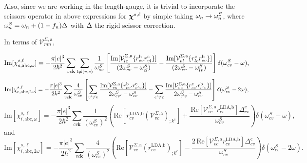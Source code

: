 \documentclass{article}
\begin{document}
Also, since we are working in the length-gauge, it is trivial to
incorporate the scissors operator in above expressions for $\boldsymbol{\chi}^{s,\ell}$
by simple taking
$\omega_n\to\omega_n^S$, where $\omega_n^S=\omega_n+(1-f_n)\Delta$ with $\Delta$ the
rigid scissor correction.\cite{nastos_scissors_2005,cabellos_effects_2009}

In terms of $\mathcal{V}^{\Sigma,\text{a}}_{mn}$,

\begin{equation}\label{calvimchiewn}
\mathrm{Im}[\chi_{e,\mathrm{a}\mathrm{b}\mathrm{c},\omega}^{s,\ell}] =
-\frac{\pi |e|^3}{2\hbar^2}\sum_{vc\mathbf{k}}\sum_{l\neq(v,c)}\frac{1}{\omega^{S}_{cv}}
\left[
\frac{\mathrm{Im}[\mathcal{V}^{\Sigma,\text{a}}_{lc}\{r^{\mathrm{b}}_{cv}r^{\mathrm{c}}_{vl}\}]}{(2\omega^S_{cv}-\omega^S_{cl})}
-\frac{\mathrm{Im}[\mathcal{V}^{\Sigma,\text{a}}_{vl}\{r^{\mathrm{c}}_{lc}r^{\mathrm{b}}_{cv}\}]}{(2\omega^S_{cv}-\omega^S_{lv})}
\right]\delta(\omega^S_{cv}-\omega),
\end{equation}  
\begin{equation}\label{calvimchie2wn}
\mathrm{Im}[\chi_{e,\mathrm{a}\mathrm{b}\mathrm{c},2\omega}^{s,\ell}] =
-\frac{\pi |e|^3}{2\hbar^2}\sum_{vc\mathbf{k}}\frac{4}{\omega^{S}_{cv}}
\left[
\sum_{v'\ne v}\frac{\mathrm{Im}[\mathcal{V}^{\Sigma,\text{a}}_{vc}\{r^{\mathrm{b}}_{cv'}r^{\mathrm{c}}_{v'v}\}]}{2\omega^S_{cv'}-\omega^S_{cv}}
- \sum_{c'\ne c}\frac{\mathrm{Im}[\mathcal{V}^{\Sigma,\text{a}}_{vc}\{r^{\mathrm{c}}_{cc'}r^{\mathrm{b}}_{c'v}\}]}{2\omega^S_{c'v}-\omega^S_{cv}}
\right]\delta(\omega^S_{cv}-2\omega),
\end{equation}
\begin{equation}\label{calvimchiwn}
\mathrm{Im}[\chi_{i,\text{a}\text{b}\text{c},\omega}^{s,\ell}]
= -\frac{\pi\vert e\vert^3}{2\hbar^2}\sum_{cv\mathbf{k}}\frac{1}{(\omega^{S}_{cv})^{2}}
\left(
\mathrm{Re}\left[r^{\text{LDA,b}}_{cv}\left(\mathcal{V}^{\Sigma,\text{a}}_{vc}\right)_{;k^{\text{c}}}\right]
+\frac{\,\mathrm{Re}\left[\mathcal{V}^{\Sigma,\text{a}}_{vc}r^{\text{LDA,b}}_{cv}\right]\Delta^{\text{c}}_{cv}}{\omega^{S}_{cv}} 
\right)\delta(\omega^{S}_{cv}-\omega),
\end{equation}
and
\begin{equation}\label{calvimchi2wn}
\mathrm{Im}[\chi_{i,\text{a}\text{b}\text{c},2\omega}^{s,\ell}] = -\frac{\pi \vert e\vert^{3}}{2\hbar^2}\sum_{vc\mathbf{k}}\frac{4}{(\omega^{S}_{cv})^{2}}\left(\mathrm{Re}\left[\mathcal{V}^{\Sigma,\text{a}}_{vc}\left(r^{\text{LDA,b}}_{cv}\right)_{;k^{\text{c}}}\right] - \frac{2\,\mathrm{Re}\left[\mathcal{V}^{\Sigma,\text{a}}_{vc}r^{\text{LDA,b}}_{cv}\right]\Delta^{\text{c}}_{cv}}{\omega^{S}_{cv}}\right)\delta(\omega^{S}_{cv}-2\omega).
\end{equation}
\end{document}
